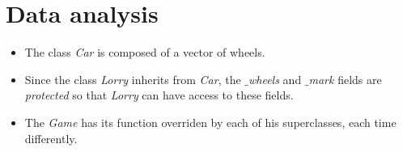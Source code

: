 \documentclass{article}
\begin{document}
	\section{Data analysis}
		\begin{itemize}
			\item The class \textit{Car} is composed of a vector of wheels.

			\item Since the class \textit{Lorry} inherits from \textit{Car}, the \textit{$\_$wheels} and \textit{$\_$mark} fields are \textit{protected} so that \textit{Lorry} can have access to these fields.

			\item The \textit{Game} has its function  overriden by each of his superclasses, each time differently.
		\end{itemize}
\end{document}
